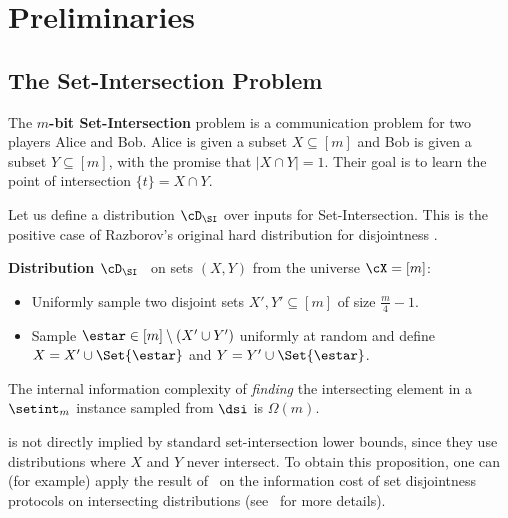 \section{Preliminaries} \label{sec:prelim}



\subsection{The Set-Intersection Problem}

\begin{definition}
    The \textbf{$m$-bit Set-Intersection} problem is a communication problem
    for two players Alice and Bob.
    Alice is given a subset $X \subseteq [m]$ and Bob is given a subset
    $Y \subseteq [m]$, with the promise that $|X \cap Y| = 1$.
    Their goal is to learn the point of intersection $\{t\} = X \cap Y$. 
\end{definition}

Let us define a distribution $\cD_\SI$ over inputs for Set-Intersection. This is the positive case of Razborov's original hard distribution for disjointness \cite{Razborov92}.

\begin{tbox}
    \textbf{Distribution $\cD_\SI$}~\cite{AssadiR20} on sets
    $(X, Y)$ from the universe $\cX=[m]$: 

    \begin{itemize}
    \item Uniformly sample two disjoint sets $X', Y' \subseteq [m]$ of size
      $\frac m 4 - 1$.
    \item Sample $\estar \in [m]\setminus(X' \cup Y')$ uniformly at random
      and define $X = X' \cup \Set{\estar}$ and $Y = Y' \cup \Set{\estar}$.
\end{itemize}
\end{tbox}

\begin{proposition}\label{prop:SI-hard}
  The internal information complexity of \emph{finding} the intersecting element
  in a $\setint_m$ instance sampled from $\dsi$ is $\Omega(m)$.
\end{proposition}

 is not directly implied by standard set-intersection lower
bounds, since they use distributions where $X$ and $Y$ never intersect.
To obtain this proposition, one can (for example) apply the result
of~\cite{JayramKS03} on the information cost of set disjointness protocols on
intersecting distributions (see~\cite{AssadiCK19} for more details).

